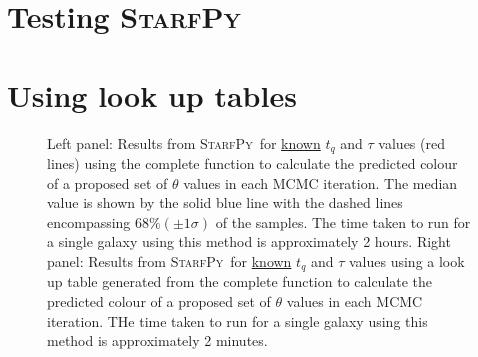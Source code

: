 \documentclass[useAMS,usenatbib]{mn2e}
\def\starfpy {\textsc{StarfPy}}
\begin{document}
\appendix
\section{Testing \starfpy}

\section{Using look up tables}

\begin{figure}
\caption{Left panel: Results from \starfpy ~for \underline{known} $t_q$ and $\tau$ values (red lines) using the complete function to calculate the predicted colour of a proposed set of $\theta$ values in each MCMC iteration. The median value is shown by the solid blue line with the dashed lines encompassing $68\% (\pm 1\sigma)$ of the samples. The time taken to run for a single galaxy using this method is approximately 2 hours. Right panel: Results from \starfpy ~for \underline{known} $t_q$ and $\tau$ values using a look up table generated from the complete function to calculate the predicted colour of a proposed set of $\theta$ values in each MCMC iteration. THe time taken to run for a single galaxy using this method is approximately 2 minutes.}
\label{sfr_mass_col}
\end{figure}
\end{document}
